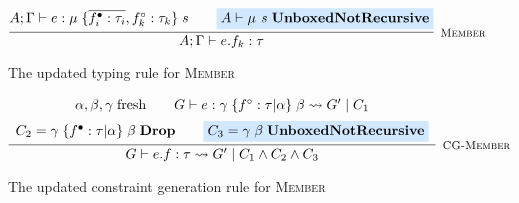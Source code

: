 \begin{figure}
    \centering
    \[
        \infer[\textsc{\footnotesize{Member}}]{
            A;\Gamma \vdash e.f_k : \tau
        }{
            A;\Gamma \vdash e : \mu\; \{ \overline{f_i^\bullet : \tau_i}, f_k^\circ : \tau_k \}\; s
            &\hspace{1em}
            \colorbox{highlighteq}{$A \vdash \mu \textit{ s } \textbf{UnboxedNotRecursive}$}
        }
    \]
    
    \caption{The updated typing rule for \textsc{Member}}
    \label{fig:membertypingrule}
\end{figure}

\begin{figure}
    \centering
    \[
        \infer[\textsc{\footnotesize{CG-Member}}]{
            G \vdash e.f : \tau \rightsquigarrow G'\; |\; C_1 \land C_2 \land C_3
        }{
            \begin{array}{c}
                \alpha, \beta, \gamma\; \text{fresh}
                \hspace{2em}
                G \vdash e : \gamma\; \{ f^\circ : \tau | \alpha \}\; \beta \rightsquigarrow G'\; |\; C_1 \\[5pt]
                C_2 = \gamma\; \{ f^\bullet : \tau | \alpha \}\; \beta\; \textbf{Drop}
                \hspace{2em}
                \colorbox{highlighteq}{$C_3 = \gamma\; \beta\; \textbf{UnboxedNotRecursive}$}
            \end{array}
        }
    \]
    
    \caption{The updated constraint generation rule for \textsc{Member}}
    \label{fig:memberconstraintgen}
\end{figure}

